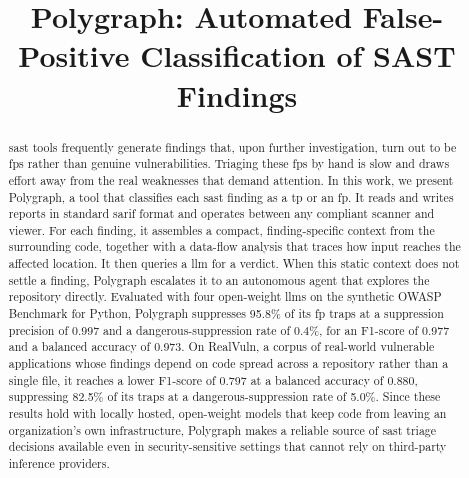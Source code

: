 \documentclass[conference]{IEEEtran}
\begin{document}
\title{Polygraph: Automated False-Positive Classification of SAST Findings}

\author{
\and
{}
\and
{}
}

\maketitle

\begin{abstract}
\Ac{sast} tools frequently generate findings
that, upon further investigation, turn out to be \acp{fp} rather than
genuine vulnerabilities. Triaging these \acp{fp} by hand is slow and
draws effort away from the real weaknesses that demand attention. In
this work, we present Polygraph, a tool that classifies each \ac{sast} finding as
a \ac{tp} or an \ac{fp}. It reads and writes reports in standard \ac{sarif}
format and operates between any compliant scanner and viewer. For each finding,
it assembles a compact, finding-specific context from the surrounding code,
together with a data-flow analysis that traces how input reaches the affected
location. It then queries a \ac{llm} for a verdict. When this static
context does not settle a finding, Polygraph escalates it to an autonomous agent
that explores the repository directly. Evaluated with four open-weight \acp{llm}
on the synthetic OWASP Benchmark for Python, Polygraph suppresses 95.8\% of
its \ac{fp} traps at a suppression precision of 0.997 and a
dangerous-suppression rate of 0.4\%, for an F1-score of 0.977 and a balanced
accuracy of 0.973. On RealVuln, a corpus of real-world vulnerable applications
whose findings depend on code spread across a repository rather than a single
file, it reaches a lower F1-score of 0.797 at a balanced accuracy of 0.880,
suppressing 82.5\% of its traps at a dangerous-suppression rate of 5.0\%.
Since these results hold with locally hosted, open-weight models that keep
code from leaving an organization's own infrastructure, Polygraph makes a
reliable source of \ac{sast} triage decisions available even in
security-sensitive settings that cannot rely on third-party inference
providers.
\end{abstract}
\end{document}
